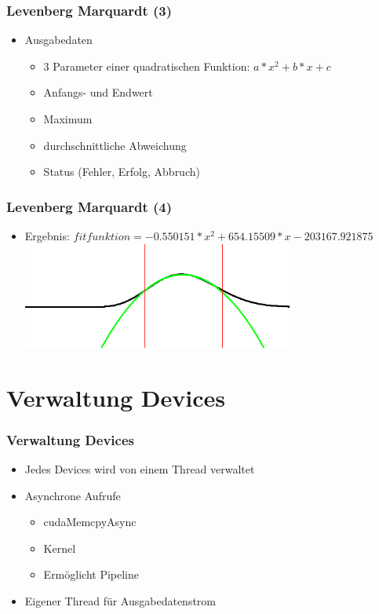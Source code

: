 \documentclass[ddcfooter]{tudbeamer}
\begin{document}
\begin{frame}
    \frametitle*{Levenberg Marquardt (3)}
	\begin{itemize}
        \item{Ausgabedaten}
        	\begin{itemize}
        		\item{3 Parameter einer quadratischen Funktion: $a*x^2+b*x+c$}
        		\item{Anfangs- und Endwert}
        		\item{Maximum}
        		\item{durchschnittliche Abweichung}
        		\item{Status (Fehler, Erfolg, Abbruch)}
        		
        	\end{itemize}
    \end{itemize}
\end{frame}
\begin{frame}
    \frametitle*{Levenberg Marquardt (4)}
	\begin{itemize}
        \item{Ergebnis: $fitfunktion=-0.550151*x^2+654.15509*x-203167.921875$}
        \includegraphics[height=3.5cm]{Beispielergebnis.png}
    \end{itemize}
\end{frame}
\section{Verwaltung Devices}
\begin{frame}
    \frametitle*{Verwaltung Devices}
    \begin{itemize}
    	\item{Jedes Devices wird von einem Thread verwaltet}
    	\item{Asynchrone Aufrufe}
		\begin{itemize}
			\item{cudaMemcpyAsync}
			\item{Kernel}
			\item{Ermöglicht Pipeline}
		\end{itemize}
    	\item{Eigener Thread für Ausgabedatenstrom}
    \end{itemize}
\end{frame}
\end{document}
